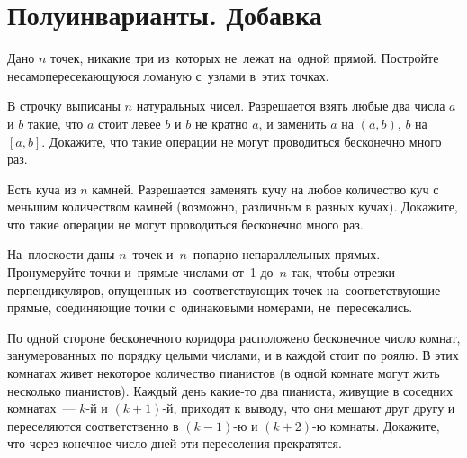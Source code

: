 
\section*{Полуинварианты. Добавка}



\begin{problems}

\item
Дано $n$ точек, никакие три из~которых не~лежат на~одной прямой.
Постройте несамопересекающуюся ломаную с~узлами в~этих точках.

\item
В строчку выписаны $n$ натуральных чисел.
Разрешается взять любые два числа $a$ и $b$ такие, что $a$ стоит левее $b$ и
$b$ не кратно $a$, и заменить $a$ на $(a, b)$, $b$ на $[a, b]$.
Докажите, что такие операции не могут проводиться бесконечно много раз.

\item
Есть куча из $n$ камней.
Разрешается заменять кучу на любое количество куч с меньшим количеством камней
(возможно, различным в разных кучах).
Докажите, что такие операции не могут проводиться бесконечно много раз.

\item
На~плоскости даны $n$~точек и~$n$~попарно непараллельных прямых.
Пронумеруйте точки и~прямые числами от~1 до~$n$ так, чтобы отрезки
перпендикуляров, опущенных из~соответствующих точек на~соответствующие прямые,
соединяющие точки с~одинаковыми номерами, не~пересекались.

\item
По одной стороне бесконечного коридора расположено бесконечное число комнат,
занумерованных по порядку целыми числами, и в каждой стоит по роялю.
В этих комнатах живет некоторое количество пианистов
(в одной комнате могут жить несколько пианистов).
Каждый день какие-то два пианиста, живущие в соседних комнатах~--- $k$-й и
$(k + 1)$-й, приходят к выводу, что они мешают друг другу и переселяются
соответственно в $(k - 1)$-ю и $(k + 2)$-ю комнаты.
Докажите, что через конечное число дней эти переселения прекратятся.

\end{problems}

